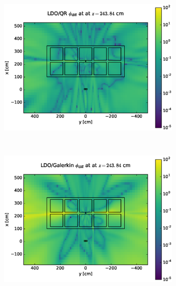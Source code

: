 \documentclass{article} %
\begin{document}
\clearpage
\begin{figure}[!htb]
\begin{subfigure}{\textwidth}
\centering
\includegraphics[max height=0.445\textheight]
{img/portal-flux-diff-qr.eps}
\end{subfigure}
\\
\begin{subfigure}{\textwidth}
\centering
\includegraphics[max height=0.445\textheight]
{img/portal-flux-diff-gkn.eps}
\end{subfigure}
\end{figure}
\clearpage
\end{document}
